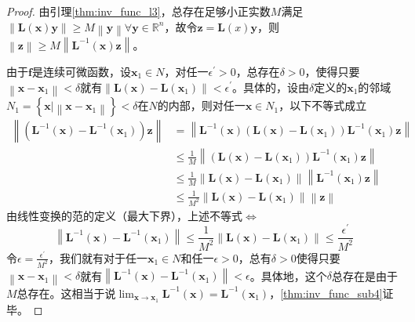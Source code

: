 \documentclass[main.tex]{subfiles}
\begin{document}
\begin{proof}
    由引理\ref{thm:inv_func_l3}，总存在足够小正实数$M$满足$\left\|\mathbf{L}\left(\mathbf{x}\right)\mathbf{y}\right\|\geq M\left\|\mathbf{y}\right\|\forall\mathbf{y}\in\mathbb{R}^n$，故令$\mathbf{z}=\mathbf{L}\left(x\right)\mathbf{y}$，则$\left\|\mathbf{z}\right\|\geq M\left\|\mathbf{L}^{-1}\left(\mathbf{x}\right)\mathbf{z}\right\|$。

    由于$\mathbf{f}$是连续可微函数，设$\mathbf{x}_1\in N$，对任一$\epsilon^\prime>0$，总存在$\delta>0$，使得只要$\left\|\mathbf{x}-\mathbf{x}_1\right\|<\delta$就有$\left\|\mathbf{L}\left(\mathbf{x}\right)-\mathbf{L}\left(\mathbf{x}_1\right)\right\|<\epsilon^\prime$。具体的，设由$\delta$定义的$\mathbf{x}_1$的邻域$N_1=\left\{\mathbf{x}|\left\|\mathbf{x}-\mathbf{x}_1\right\|\right\}<\delta$在$N$的内部，则对任一$\mathbf{x}\in N_1$，以下不等式成立
    \begin{align*}
        \left\|\left(\mathbf{L}^{-1}\left(\mathbf{x}\right)-\mathbf{L}^{-1}\left(\mathbf{x}_1\right)\right)\mathbf{z}\right\| & =\left\|\mathbf{L}^{-1}\left(\mathbf{x}\right)\left(\mathbf{L}\left(\mathbf{x}\right)-\mathbf{L}\left(\mathbf{x}_1\right)\right)\mathbf{L}^{-1}\left(\mathbf{x}_1\right)\mathbf{z}\right\| \\
                                                                                                                              & \leq\frac{1}{M}\left\|\left(\mathbf{L}\left(\mathbf{x}\right)-\mathbf{L}\left(\mathbf{x}_1\right)\right)\mathbf{L}^{-1}\left(\mathbf{x}_1\right)\mathbf{z}\right\|                         \\
                                                                                                                              & \leq\frac{1}{M}\left\|\mathbf{L}\left(\mathbf{x}\right)-\mathbf{L}\left(\mathbf{x}_1\right)\right\|\left\|\mathbf{L}^{-1}\left(\mathbf{x}_1\right)\mathbf{z}\right\|                       \\
                                                                                                                              & \leq\frac{1}{M^2}\left\|\mathbf{L}\left(\mathbf{x}\right)-\mathbf{L}\left(\mathbf{x}_1\right)\right\|\left\|\mathbf{z}\right\|
    \end{align*}
    由线性变换的范的定义（最大下界），上述不等式$\Leftrightarrow$
    \[\left\|\mathbf{L}^{-1}\left(\mathbf{x}\right)-\mathbf{L}^{-1}\left(\mathbf{x}_1\right)\right\|\leq\frac{1}{M^2}\left\|\mathbf{L}\left(\mathbf{x}\right)-\mathbf{L}\left(\mathbf{x}_1\right)\right\|\leq\frac{\epsilon^\prime}{M^2}\]
    令$\epsilon=\frac{\epsilon^\prime}{M^2}$，我们就有对于任一$\mathbf{x}_1\in N$和任一$\epsilon>0$，总有$\delta>0$使得只要$\left\|\mathbf{x}-\mathbf{x}_1\right\|<\delta$就有$\left\|\mathbf{L}^{-1}\left(\mathbf{x}\right)-\mathbf{L}^{-1}\left(\mathbf{x}_1\right)\right\|<\epsilon$。具体地，这个$\delta$总存在是由于$M$总存在。这相当于说$\lim_{\mathbf{x}\to\mathbf{x}_1}\mathbf{L}^{-1}\left(\mathbf{x}\right)=\mathbf{L}^{-1}\left(\mathbf{x}_1\right)$，\ref{thm:inv_func_sub4}证毕。
\end{proof}
\end{document}
